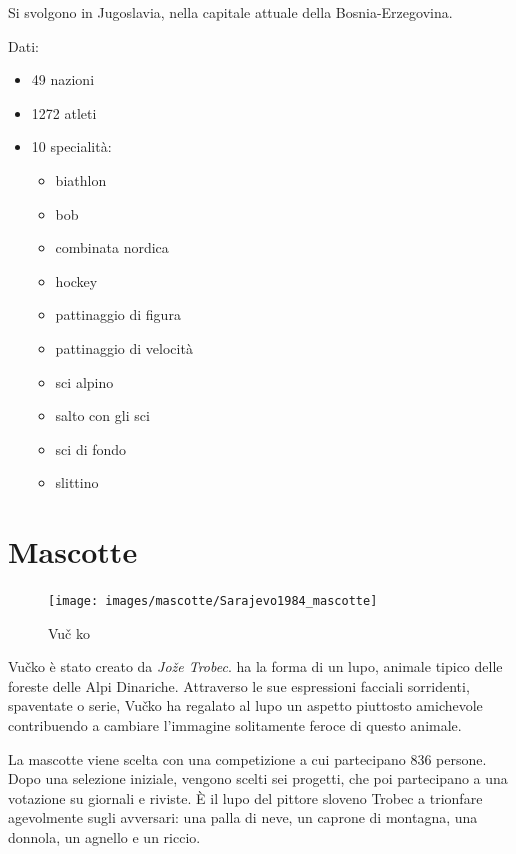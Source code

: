 \documentclass[
]{book}
\providecommand{\tightlist}{%
  \setlength{\itemsep}{0pt}\setlength{\parskip}{0pt}}
\begin{document}
Si svolgono in Jugoslavia, nella capitale attuale della Bosnia-Erzegovina.

Dati:

\begin{itemize}
\tightlist
\item
  49 nazioni
\item
  1272 atleti
\item
  10 specialità:

  \begin{itemize}
  \tightlist
  \item
    biathlon
  \item
    bob
  \item
    combinata nordica
  \item
    hockey
  \item
    pattinaggio di figura
  \item
    pattinaggio di velocità
  \item
    sci alpino
  \item
    salto con gli sci
  \item
    sci di fondo
  \item
    slittino
  \end{itemize}
\end{itemize}

\section*{Mascotte}\label{mascotte-3}

\begin{figure}
\texttt{[image: images/mascotte/Sarajevo1984\_mascotte]} \caption{Vuč ko}\label{fig:unnamed-chunk-46}
\end{figure}

Vučko è stato creato da \emph{Jože Trobec}.
ha la forma di un lupo, animale tipico delle foreste delle Alpi Dinariche. Attraverso le sue espressioni facciali sorridenti, spaventate o serie, Vučko ha regalato al lupo un aspetto piuttosto amichevole contribuendo a cambiare l'immagine solitamente feroce di questo animale.

La mascotte viene scelta con una competizione a cui partecipano 836 persone. Dopo una selezione iniziale, vengono scelti sei progetti, che poi partecipano a una votazione su giornali e riviste. È il lupo del pittore sloveno Trobec a trionfare agevolmente sugli avversari: una palla di neve, un caprone di montagna, una donnola, un agnello e un riccio.
\end{document}
